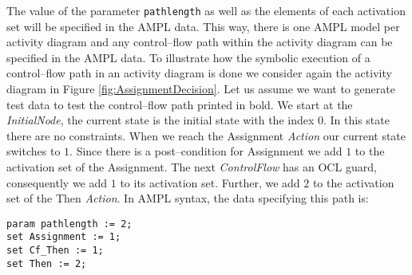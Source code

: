 \documentclass[runningheads,a4paper]{llncs}%
\newcommand{\UMLType}[1]{\textsf{\textit{#1}}} %
\newcommand{\AMPLCode}[1]{\texttt{#1}}
\begin{document}
The value of the parameter \AMPLCode{pathlength} as well as the elements of each activation set will be specified in the AMPL data. This way, there is one AMPL model per activity diagram and any control--flow path within the activity diagram can be specified in the AMPL data. To illustrate how the symbolic execution of a control--flow path in an activity diagram is done we consider again the activity diagram in Figure \ref{fig:AssignmentDecision}. Let us assume we want to generate test data to test the control--flow path printed in bold. We start at the \UMLType{InitialNode}, the current state is the initial state with the index $0$. In this state there are no constraints. When we reach the Assignment \UMLType{Action} our current state switches to $1$. Since there is a post--condition for Assignment we add $1$ to the activation set of the Assignment. The next \UMLType{ControlFlow} has an OCL guard, consequently we add $1$ to its activation set. Further, we add $2$ to the activation set of the Then \UMLType{Action}.%
In AMPL syntax, the data specifying this path is:%
\begin{lstlisting}[basicstyle=\ttfamily,language=ampl]
param pathlength := 2;
set Assignment := 1;
set Cf_Then := 1;
set Then := 2;
\end{lstlisting}%
\end{document}
